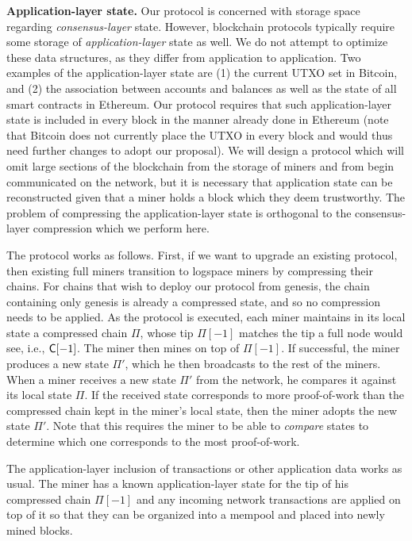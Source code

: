 \noindent
\textbf{Application-layer state.}
Our protocol is concerned with storage space regarding \emph{consensus-layer}
state. However, blockchain protocols typically require some storage of
\emph{application-layer} state as well. We do not attempt to optimize these data
structures, as they differ from application to application. Two examples of the
application-layer state are (1) the current UTXO set in Bitcoin, and
(2) the association between accounts and balances as well as the state of all
smart contracts in Ethereum. Our protocol requires that such application-layer
state is included in every block in the manner already done in Ethereum (note
that Bitcoin does not currently place the UTXO in every block and would thus
need further changes to adopt our proposal). We will design a protocol which
will omit large sections of the blockchain from the storage of miners and from
begin communicated on the network, but it is necessary that application state can be
reconstructed given that a miner holds a block which they deem trustworthy. The
problem of compressing the application-layer state is orthogonal to the
consensus-layer compression which we perform here.

The protocol works as follows. First, if we want to upgrade an existing
protocol, then existing full miners transition to logspace miners by compressing
their chains. For chains that wish to deploy our protocol from genesis, the
chain containing only genesis is already a compressed state, and so no
compression needs to be applied. As the protocol is executed, each miner
maintains in its local state a compressed chain $\Pi$, whose tip $\Pi[-1]$
matches the tip a full node would see, i.e., $\mathsf{C}[-1]$. The miner then mines
on top of $\Pi[-1]$. If successful, the miner produces a new state $\Pi'$, which
he then broadcasts to the rest of the miners. When a miner receives a new state
$\Pi'$ from the network, he compares it against its local state $\Pi$. If the
received state corresponds to more proof-of-work than the compressed chain kept
in the miner's local state, then the miner adopts the new state $\Pi'$. Note
that this requires the miner to be able to \emph{compare} states to determine
which one corresponds to the most proof-of-work.

The application-layer inclusion of transactions or other application data works
as usual. The miner has a known application-layer state for the tip of his
compressed chain $\Pi[-1]$ and any incoming network transactions are applied on
top of it so that they can be organized into a mempool and placed into newly
mined blocks.


